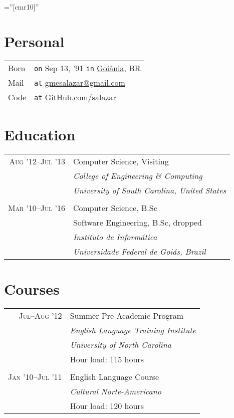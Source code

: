 \documentclass[a4paper,10pt]{article}
\begin{document}
\font\fb=''[cmr10]''

\par{\bigskip\par\vspace{6ex}}

\section{Personal}

\begin{tabular}{l@{\hskip 0.2cm}l}
  Born & \texttt{on} Sep 13, '91 \texttt{in}
                     \href{https://en.wikipedia.org/wiki/Goiania}{Goiânia}, BR \\
  Mail & \texttt{at} \href{mailto:gmesalazar@gmail.com}
                          {gmesalazar@gmail.com} \\
  Code & \texttt{at} \href{https://www.github.com/salazar/}
                          {GitHub.com/salazar}
\end{tabular}

\section{Education}

\begin{tabular}{r|p{11cm}}
  \textsc{Aug '12--Jul '13} & Computer Science, Visiting\\ &
  \emph{College of Engineering \& Computing}\\ &
  \emph{University of South Carolina, United States}
  \\\multicolumn{2}{c}{} \\

  \textsc{Mar '10--Jul '16} & Computer Science, B.Sc\\ &
  Software Engineering, B.Sc, dropped \\ &
  \emph{Instituto de Informática}\\ &
  \emph{Universidade Federal de Goiás, Brazil} \\
\end{tabular}

\section{Courses}

\begin{tabular}{r|p{11cm}}
  \textsc{Jul--Aug '12} & Summer Pre-Academic Program\\ &
  \emph{English Language Training Institute}\\ &
  \emph{University of North Carolina}\\ &
  Hour load: 115 hours
  \\\multicolumn{2}{c}{} \\

  \textsc{Jan '10--Jul '11} & English Language Course\\ &
  \emph{Cultural Norte-Americano} \\ &
  Hour load: 120 hours
\end{tabular}
\end{document}
